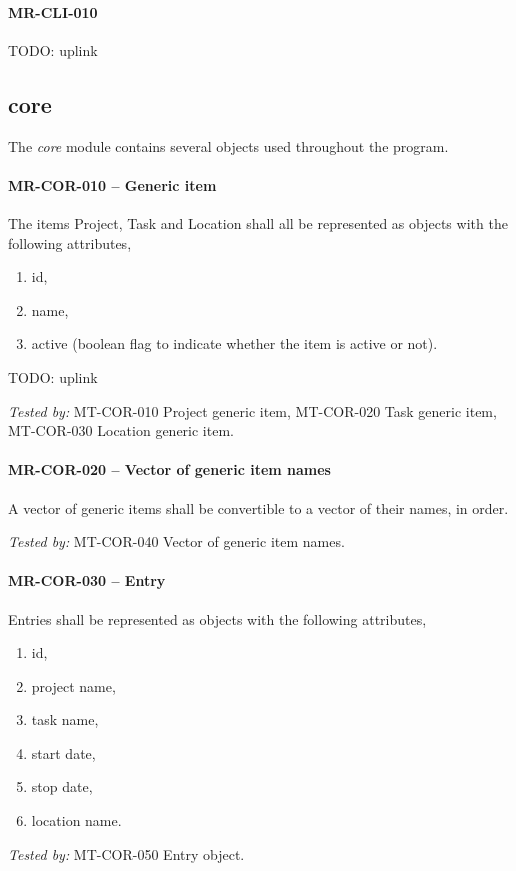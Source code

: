\paragraph{MR-CLI-010}
TODO: uplink

\subsection{core}
The \emph{core} module contains several objects used throughout the program.

\paragraph{MR-COR-010 -- Generic item}
The items Project, Task and Location shall all be represented as objects with
the following attributes,
\begin{enumerate}
\item id,
\item name,
\item active (boolean flag to indicate whether the item is active or not).
\end{enumerate}
TODO: uplink

\textit{Tested by: } MT-COR-010 Project generic item,
MT-COR-020 Task generic item, MT-COR-030 Location generic item.

\paragraph{MR-COR-020 -- Vector of generic item names}
A vector of generic items shall be convertible to a vector of their names,
in order.

\textit{Tested by: } MT-COR-040 Vector of generic item names.

\paragraph{MR-COR-030 -- Entry}
Entries shall be represented as objects with the following attributes,
\begin{enumerate}
\item id,
\item project name,
\item task name,
\item start date,
\item stop date,
\item location name.
\end{enumerate}

\textit{Tested by: } MT-COR-050 Entry object.


